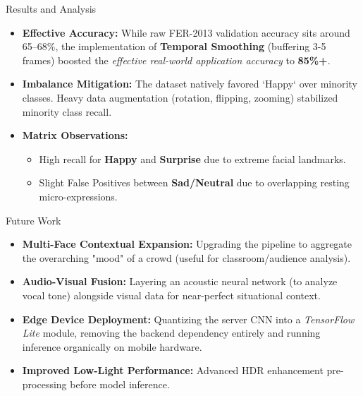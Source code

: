 \documentclass[aspectratio=169]{beamer}
\begin{document}
\begin{frame}{Results and Analysis}
\begin{itemize}
    \item \textbf{Effective Accuracy:} While raw FER-2013 validation accuracy sits around 65--68\%, the implementation of \textbf{Temporal Smoothing} (buffering 3-5 frames) boosted the \textit{effective real-world application accuracy} to \textbf{85\%+}.
    \item \textbf{Imbalance Mitigation:} The dataset natively favored `Happy` over minority classes. Heavy data augmentation (rotation, flipping, zooming) stabilized minority class recall.
    \item \textbf{Matrix Observations:}
    \begin{itemize}
        \item High recall for \textbf{Happy} and \textbf{Surprise} due to extreme facial landmarks.
        \item Slight False Positives between \textbf{Sad/Neutral} due to overlapping resting micro-expressions.
    \end{itemize}
\end{itemize}
\end{frame}


\begin{frame}{Future Work}
\begin{itemize}
    \item \textbf{Multi-Face Contextual Expansion:} Upgrading the pipeline to aggregate the overarching "mood" of a crowd (useful for classroom/audience analysis).
    \item \textbf{Audio-Visual Fusion:} Layering an acoustic neural network (to analyze vocal tone) alongside visual data for near-perfect situational context.
    \item \textbf{Edge Device Deployment:} Quantizing the server CNN into a \textit{TensorFlow Lite} module, removing the backend dependency entirely and running inference organically on mobile hardware.
    \item \textbf{Improved Low-Light Performance:} Advanced HDR enhancement pre-processing before model inference.
\end{itemize}
\end{frame}
\end{document}
